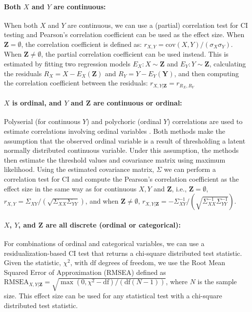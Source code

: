 \documentclass{uai2025} %
\begin{document}
\paragraph{Both $ X $ and $ Y $ are continuous: }
When both $ X $ and $ Y $ are continuous, we can use a (partial) correlation
test for CI testing and Pearson's correlation coefficient can be used as the
effect size. When $ \bm{Z} = \emptyset $, the correlation coefficient is
defined as: $ r_{X, Y} = \mathrm{cov}(X, Y) / (\sigma_X \sigma_Y) $. When $
\bm{Z} \neq \emptyset $, the partial correlation coefficient can be used instead.
This is estimated by fitting two regression models $ E_X: X \sim \bm{Z} $ and $ E_Y: Y
\sim \bm{Z} $, calculating the residuals $ R_X = X - E_X(\bm{Z}) $ and $ R_Y =
Y - E_Y(\bm{Y}) $, and then computing the correlation coefficient between the
residuals: $r_{X, Y \rvert \bm{Z}} = r_{R_X, R_Y}$

\paragraph{$ X $ is ordinal, and $ Y $ and $ \bm{Z} $  are continuous or ordinal: }

Polyserial (for continuous $Y$) and polychoric
(ordinal $Y$) correlations are used to estimate correlations 
involving ordinal variables \citep{Poon1987}. Both methods make the assumption that the
observed ordinal variable is a result of thresholding a latent normally
distributed continuous variable. Under this assumption, the methods then 
estimate the threshold values and covariance matrix using maximum likelihood.
Using the estimated covariance matrix, $ \Sigma $ we can perform a correlation
test for CI and compute the Pearson's correlation coefficient as the effect
size in the same way as for continuous $ X, Y $ and $ \bm{Z} $, i.e., 
$\bm{Z} = \emptyset $, $ r_{X, Y} = \Sigma_{XY} / (\sqrt{\Sigma_{XX} \Sigma_{YY}}) $, 
	and when $ \bm{Z} \ne \emptyset $,
	$ r_{X, Y \rvert \bm{Z}} = - \Sigma^{-1}_{XY}/ (\sqrt{\Sigma^{-1}_{XX} \Sigma^{-1}_{YY}}) $.

\paragraph{$ X $, $ Y $, and $ \bm{Z} $ are all discrete (ordinal or categorical): }

For combinations of ordinal and categorical variables, we
can use a residualization-based CI test \citep{Ankan2023} that returns a 
chi-square distributed test statistic. Given the statistic, $ \chi^2 $, with $ \textrm{df} $ degrees of
freedom, we use the Root Mean Squared Error of Approximation (RMSEA) defined as
 $ \textrm{RMSEA}_{X, Y \rvert \bm{Z}} =
\sqrt{\max(0,\chi^2 - \textrm{df})/ (\textrm{df} (N-1))} $, where $ N $ is the sample
size. This effect size can be used for any statistical test with a chi-square 
distributed test statistic. 
\end{document}

